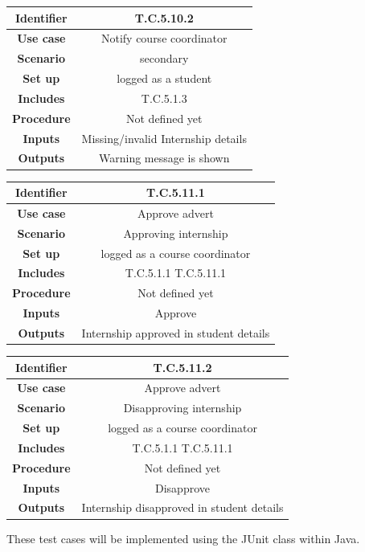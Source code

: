 \documentclass{l3deliverable}
\begin{document}
\begin{tabular}{|c|c|}
\hline \textbf{Identifier} & T.C.5.10.2\\
\hline \textbf{Use case} & Notify course coordinator\\
\hline \textbf{Scenario} & secondary\\
\hline \textbf{Set up} & logged as a student\\
\hline \textbf{Includes} & T.C.5.1.3\\
\hline \textbf{Procedure} & Not defined yet\\
\hline \textbf{Inputs} & Missing/invalid Internship details\\
\hline \textbf{Outputs} & Warning message is shown\\
\hline
\end{tabular}

\begin{tabular}{|c|c|}
\hline \textbf{Identifier} & T.C.5.11.1\\
\hline \textbf{Use case} & Approve advert\\
\hline \textbf{Scenario} & Approving internship\\
\hline \textbf{Set up} & logged as a course coordinator\\
\hline \textbf{Includes} & T.C.5.1.1 T.C.5.11.1\\
\hline \textbf{Procedure} & Not defined yet\\
\hline \textbf{Inputs} & Approve\\
\hline \textbf{Outputs} & Internship approved in student details\\
\hline
\end{tabular}

\begin{tabular}{|c|c|}
\hline \textbf{Identifier} & T.C.5.11.2\\
\hline \textbf{Use case} & Approve advert\\
\hline \textbf{Scenario} & Disapproving internship\\
\hline \textbf{Set up} & logged as a course coordinator\\
\hline \textbf{Includes} & T.C.5.1.1 T.C.5.11.1\\
\hline \textbf{Procedure} & Not defined yet\\
\hline \textbf{Inputs} & Disapprove\\
\hline \textbf{Outputs} & Internship disapproved in student details\\
\hline
\end{tabular}

These test cases will be implemented using the JUnit class within
Java. 
\end{document}
